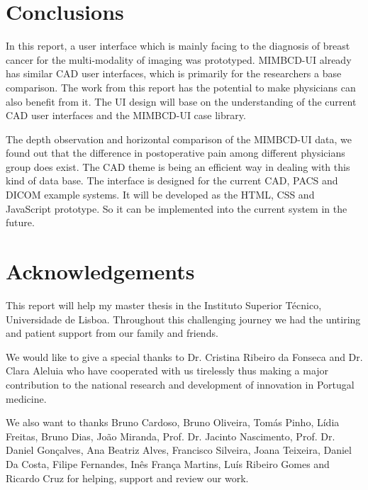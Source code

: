 \section{Conclusions}

In this report, a user interface which is mainly facing to the diagnosis of breast cancer for the multi-modality of imaging was prototyped. MIMBCD-UI already has similar CAD user interfaces, which is primarily for the researchers a base comparison. The work from this report has the potential to make physicians can also benefit from it. The UI design will base on the understanding of the current CAD user interfaces and the MIMBCD-UI case library.

The depth observation and horizontal comparison of the MIMBCD-UI data, we found out that the difference in postoperative pain among different physicians group does exist. The CAD theme is being an efficient way in dealing with this kind of data base. The interface is designed for the current CAD, PACS and DICOM example systems. It will be developed as the HTML, CSS and JavaScript prototype. So it can be implemented into the current system in the future.

\section{Acknowledgements}

This report will help my master thesis in the Instituto Superior T\'{e}cnico, Universidade de Lisboa. Throughout this challenging journey we had the untiring and patient support from our family and friends.

We would like to give a special thanks to Dr. Cristina Ribeiro da Fonseca and Dr. Clara Aleluia who have cooperated with us tirelessly thus making a major contribution to the national research and development of innovation in Portugal medicine.

We also want to thanks Bruno Cardoso, Bruno Oliveira, Tom\'{a}s Pinho, L\'{i}dia Freitas, Bruno Dias, Jo\~{a}o Miranda, Prof. Dr. Jacinto Nascimento, Prof. Dr. Daniel Gon\c{c}alves, Ana Beatriz Alves, Francisco Silveira, Joana Teixeira, Daniel Da Costa, Filipe Fernandes, In\^{e}s Fran\c{c}a Martins, Lu\'{i}s Ribeiro Gomes and Ricardo Cruz for helping, support and review our work.

\clearpage

\printbibliography


